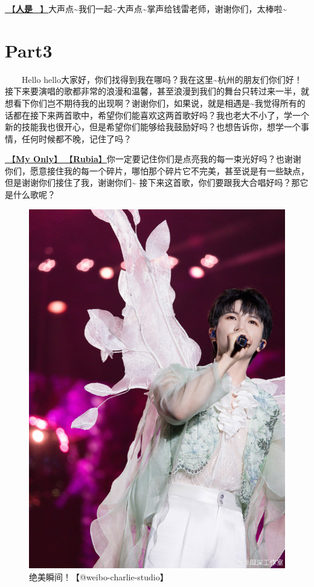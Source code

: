 \documentclass[]{ctexbook}
\begin{document}
\hyperref[renshi]{🎵【\textbf{人是\_}】}大声点\textasciitilde 我们一起\textasciitilde 大声点\textasciitilde 掌声给钱雷老师，谢谢你们，太棒啦\textasciitilde{}

\section{Part3}\label{hangzhou-20240823-part3}

  Hello hello大家好，你们找得到我在哪吗？我在这里\textasciitilde 杭州的朋友们你们好！接下来要演唱的歌都非常的浪漫和温馨，甚至浪漫到我们的舞台只转过来一半，就想看下你们岂不期待我的出现啊？谢谢你们，如果说，就是相遇是\textasciitilde 我觉得所有的话都在接下来两首歌中，希望你们能喜欢这两首歌好吗？我也老大不小了，学一个新的技能我也很开心，但是希望你们能够给我鼓励好吗？也想告诉你，想学一个事情，任何时候都不晚，记住了吗？

\hyperref[my-only]{🎵【\textbf{My Only}】}\hyperref[rubia]{🎵【\textbf{Rubia}】}你一定要记住你们是点亮我的每一束光好吗？也谢谢你们，愿意接住我的每一个碎片，哪怕那个碎片它不完美，甚至说是有一些缺点，但是谢谢你们接住了我，谢谢你们\textasciitilde{}
接下来这首歌，你们要跟我大合唱好吗？那它是什么歌呢？

\begin{figure}

{\centering \includegraphics[width=450pt]{img/hangzhou20240823/001} 

}

\caption{绝美瞬间！【@weibo-charlie-studio】}\label{fig:unnamed-chunk-81}
\end{figure}
\end{document}
